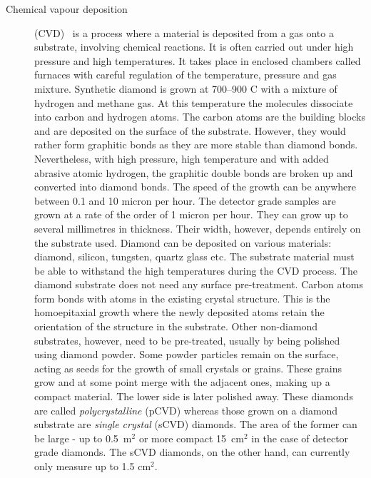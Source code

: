 \begin{description}
\item[Chemical vapour deposition] (CVD)~\cite{} is a process where a material is deposited from a gas onto a substrate, involving chemical reactions. It is often carried out under high pressure and high temperatures. It takes place in enclosed chambers called furnaces with careful regulation of the temperature, pressure and gas mixture. Synthetic diamond is grown at 700--900 \textdegree C with a mixture of hydrogen and methane gas. At this temperature the molecules dissociate into carbon and hydrogen atoms. The carbon atoms are the building blocks and are deposited on the surface of the substrate. However, they would rather form graphitic bonds as they are more stable than diamond bonds. Nevertheless, with high pressure, high temperature and with added abrasive atomic hydrogen, the graphitic double bonds are broken up and converted into diamond bonds. The speed of the growth can be anywhere between 0.1 and 10 micron per hour. The detector grade samples are grown at a rate of the order of 1 micron per hour. They can grow up to several millimetres in thickness. Their width, however, depends entirely on the substrate used. Diamond can be deposited on various materials: diamond, silicon, tungsten, quartz glass etc. The substrate material must be able to withstand the high temperatures during the CVD process. The diamond substrate does not need any surface pre-treatment. Carbon atoms form bonds with atoms in the existing crystal structure. This is the homoepitaxial growth where the newly deposited atoms retain the orientation of the structure in the substrate. Other non-diamond substrates, however, need to be pre-treated, usually by being polished using diamond powder. Some powder particles remain on the surface, acting as seeds for the growth of small crystals or grains. These grains grow and at some point merge with the adjacent ones, making up a compact material. The lower side is later polished away. These diamonds are called \emph{polycrystalline} (pCVD) whereas those grown on a diamond substrate are \emph{single crystal} (sCVD) diamonds. The area of the former can be large - up to 0.5~m$^2$ or more compact 15~cm$^2$ in the case of detector grade diamonds. The sCVD diamonds, on the other hand, can currently only measure up to 1.5 cm$^2$.
\end{description}

